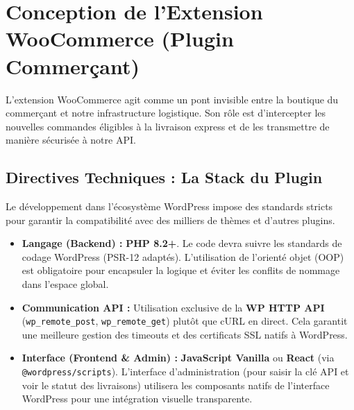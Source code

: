 \newpage





\section{Conception de l'Extension WooCommerce (Plugin Commerçant)}
\label{sec:extension_woocommerce}

L'extension WooCommerce agit comme un pont invisible entre la boutique du commerçant et notre infrastructure logistique. Son rôle est d'intercepter les nouvelles commandes éligibles à la livraison express et de les transmettre de manière sécurisée à notre API.

\subsection{Directives Techniques : La Stack du Plugin}

Le développement dans l'écosystème WordPress impose des standards stricts pour garantir la compatibilité avec des milliers de thèmes et d'autres plugins.

\begin{itemize}
    \item \textbf{Langage (Backend) :} \textbf{PHP 8.2+}. Le code devra suivre les standards de codage WordPress (PSR-12 adaptés). L'utilisation de l'orienté objet (OOP) est obligatoire pour encapsuler la logique et éviter les conflits de nommage dans l'espace global.
    \item \textbf{Communication API :} Utilisation exclusive de la \textbf{WP HTTP API} (\texttt{wp\_remote\_post}, \texttt{wp\_remote\_get}) plutôt que cURL en direct. Cela garantit une meilleure gestion des timeouts et des certificats SSL natifs à WordPress.
    \item \textbf{Interface (Frontend \& Admin) :} \textbf{JavaScript Vanilla} ou \textbf{React} (via \texttt{@wordpress/scripts}). L'interface d'administration (pour saisir la clé API et voir le statut des livraisons) utilisera les composants natifs de l'interface WordPress pour une intégration visuelle transparente.
\end{itemize}

